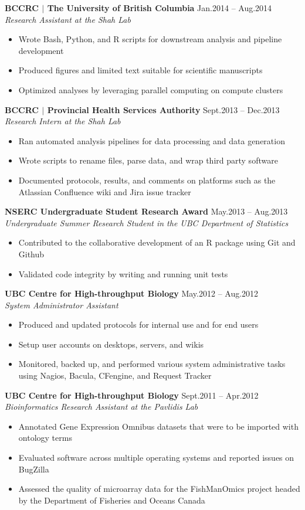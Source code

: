 \documentclass{res}
\newcommand{\linehead}[2]{%
  {\bf #1} \hfill #2\\}
\newcommand{\linetitle}[1]{%
  {\sl #1}}
\begin{document}
\begin{resume}
\linehead{BCCRC $|$ The University of British Columbia}{Jan.2014 -- Aug.2014}
\linetitle{Research Assistant at the Shah Lab}
\begin{itemize}
  \item Wrote Bash, Python, and R scripts for downstream analysis and pipeline development
  \item Produced figures and limited text suitable for scientific manuscripts
  \item Optimized analyses by leveraging parallel computing on compute clusters
\end{itemize}

\linehead{BCCRC $|$ Provincial Health Services Authority}{Sept.2013 -- Dec.2013}
\linetitle{Research Intern at the Shah Lab}
\begin{itemize}
  \item Ran automated analysis pipelines for data processing and data generation
  \item Wrote scripts to rename files, parse data, and wrap third party software
  \item Documented protocols, results, and comments on platforms such as the Atlassian Confluence wiki and Jira issue tracker
\end{itemize}

\linehead{NSERC Undergraduate Student Research Award}{May.2013 -- Aug.2013}
\linetitle{Undergraduate Summer Research Student in the UBC Department of Statistics}
\begin{itemize}
  \item Contributed to the collaborative development of an R package using Git and Github
  \item Validated code integrity by writing and running unit tests
\end{itemize}

\linehead{UBC Centre for High-throughput Biology}{May.2012 -- Aug.2012}
\linetitle{System Administrator Assistant}
\begin{itemize}
  \item Produced and updated protocols for internal use and for end users
  \item Setup user accounts on desktops, servers, and wikis
  \item Monitored, backed up, and performed various system administrative tasks using Nagios, Bacula, CFengine, and Request Tracker
\end{itemize}

\linehead{UBC Centre for High-throughput Biology}{Sept.2011 -- Apr.2012}
\linetitle{Bioinformatics Research Assistant at the Pavlidis Lab}
\begin{itemize}
  \item Annotated Gene Expression Omnibus datasets that were to be imported with ontology terms
  \item Evaluated software across multiple operating systems and reported issues on BugZilla
  \item Assessed the quality of microarray data for the FishManOmics project headed by the Department of Fisheries and Oceans Canada
\end{itemize}


\end{resume}
\end{document}
